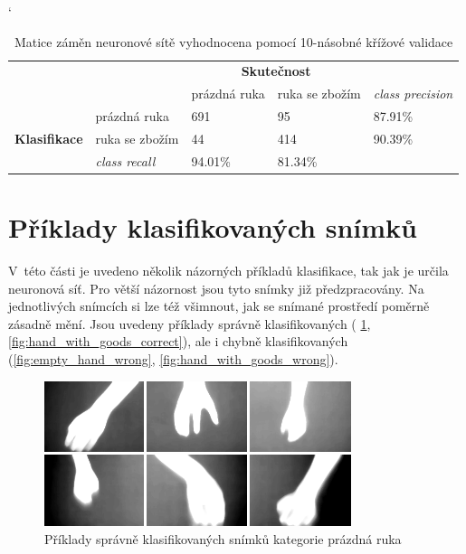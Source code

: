 \begin{table}[]
  \catcode`
  \centering
  \begin{tabular}{cl|l|l|l}
    \cline{3-4}
    \multicolumn{1}{l}{} & \multicolumn{1}{c|}{} & \multicolumn{2}{c|}{\cellcolor{Blue}\color{White}\textbf{Skutečnost}} &  \\ \cline{3-5} 
     & \multicolumn{1}{c|}{} & prázdná ruka & ruka se zbožím & \multicolumn{1}{l|}{\textit{class precision}} \\ \hline
    \multicolumn{1}{|c|}{\cellcolor{Blue}} & prázdná ruka & 691 & 95 & \multicolumn{1}{l|}{87.91\%} \\ \cline{2-5} 
    \multicolumn{1}{|c|}{\multirow{-2}{*}{\cellcolor{Blue}\color{White}\textbf{Klasifikace}}} & ruka se zbožím & 44 & 414 & \multicolumn{1}{l|}{90.39\%} \\ \hline
    \multicolumn{1}{l|}{\textit{}} & \textit{class recall} & 94.01\% & 81.34\% &  \\ \cline{2-4}
  \end{tabular}
  \caption{Matice záměn neuronové sítě vyhodnocena pomocí 10-násobné křížové validace}
  \label{table:neural_net_result}
\end{table}

\section{Příklady klasifikovaných snímků}
V~této části je uvedeno několik názorných příkladů klasifikace, tak jak je určila neuronová síť. Pro větší názornost jsou tyto snímky již předzpracovány. Na jednotlivých snímcích si lze též všimnout, jak se snímané prostředí poměrně zásadně mění. Jsou uvedeny příklady správně klasifikovaných ( \ref{fig:empty_hand_correct}, \ref{fig:hand_with_goods_correct}), ale i chybně klasifikovaných (\ref{fig:empty_hand_wrong}, \ref{fig:hand_with_goods_wrong}). 

\begin{figure}[h]
  \centering
  \includegraphics[width=0.8\textwidth]{images/empty_hand_correct.png}
  \caption{Příklady správně klasifikovaných snímků kategorie prázdná ruka}
  \label{fig:empty_hand_correct}
\end{figure} 

